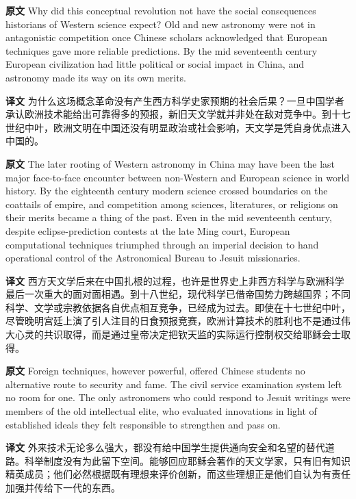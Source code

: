 \documentclass[UTF8,zihao=-4]{ctexart}
\newcommand{\BodyFont}{\fontsize{10.5pt}{15.5pt}\selectfont}
\newcommand{\origlabel}{\textbf{原文}\quad}
\newcommand{\translabel}{\textbf{译文}\quad}
\newenvironment{enblock}{\par\noindent\begingroup\BodyFont\origlabel}{\par\endgroup}
\newenvironment{zhblock}{\par\noindent\begingroup\BodyFont\translabel}{\par\endgroup\vspace{0.35em}}
\begin{document}
\begin{enblock}
Why did this conceptual revolution not have the social consequences historians of Western science expect? Old and new astronomy were not in antagonistic competition once Chinese scholars acknowledged that European techniques gave more reliable predictions. By the mid seventeenth century European civilization had little political or social impact in China, and astronomy made its way on its own merits.
\end{enblock}
\begin{zhblock}
为什么这场概念革命没有产生西方科学史家预期的社会后果？一旦中国学者承认欧洲技术能给出可靠得多的预报，新旧天文学就并非处在敌对竞争中。到十七世纪中叶，欧洲文明在中国还没有明显政治或社会影响，天文学是凭自身优点进入中国的。
\end{zhblock}

\begin{enblock}
The later rooting of Western astronomy in China may have been the last major face-to-face encounter between non-Western and European science in world history. By the eighteenth century modern science crossed boundaries on the coattails of empire, and competition among sciences, literatures, or religions on their merits became a thing of the past. Even in the mid seventeenth century, despite eclipse-prediction contests at the late Ming court, European computational techniques triumphed through an imperial decision to hand operational control of the Astronomical Bureau to Jesuit missionaries.
\end{enblock}
\begin{zhblock}
西方天文学后来在中国扎根的过程，也许是世界史上非西方科学与欧洲科学最后一次重大的面对面相遇。到十八世纪，现代科学已借帝国势力跨越国界；不同科学、文学或宗教依据各自优点相互竞争，已经成为过去。即使在十七世纪中叶，尽管晚明宫廷上演了引人注目的日食预报竞赛，欧洲计算技术的胜利也不是通过伟大心灵的共识取得，而是通过皇帝决定把钦天监的实际运行控制权交给耶稣会士取得。
\end{zhblock}

\begin{enblock}
Foreign techniques, however powerful, offered Chinese students no alternative route to security and fame. The civil service examination system left no room for one. The only astronomers who could respond to Jesuit writings were members of the old intellectual elite, who evaluated innovations in light of established ideals they felt responsible to strengthen and pass on.
\end{enblock}
\begin{zhblock}
外来技术无论多么强大，都没有给中国学生提供通向安全和名望的替代道路。科举制度没有为此留下空间。能够回应耶稣会著作的天文学家，只有旧有知识精英成员；他们必然根据既有理想来评价创新，而这些理想正是他们自认为有责任加强并传给下一代的东西。
\end{zhblock}
\end{document}
